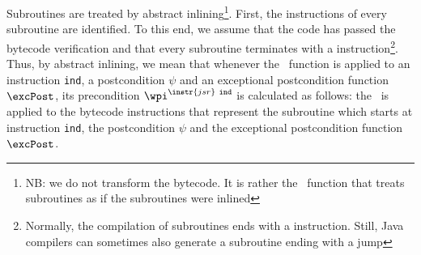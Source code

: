 \begin{itemize}
Subroutines are treated by abstract inlining\footnote{NB: we do not transform the bytecode. It is rather the \wpi \
 function that treats subroutines as if the subroutines were inlined}. First, the instructions of every subroutine
 are identified. %
To this end, we assume that the code has passed the bytecode verification and that every subroutine terminates with a  
instruction\footnote{Normally, the compilation of subroutines ends with a \instr{ret} instruction. Still, Java 
compilers can sometimes also generate a subroutine ending with a jump}. Thus, by abstract inlining, we mean that
 whenever the \wpi~function is applied to an instruction \instr{jsr}  \texttt{ind}, a postcondition $\psi$ and an exceptional postcondition function $\excPost$, its precondition  $\wpi^{\instr{jsr} \ \tt{ind}}$ is calculated as follows: the \wpi \ is applied to the bytecode instructions that represent the subroutine which starts at instruction \texttt{ind},
 the postcondition $\psi$ and the exceptional postcondition function  $\excPost$.
  







\end{itemize}